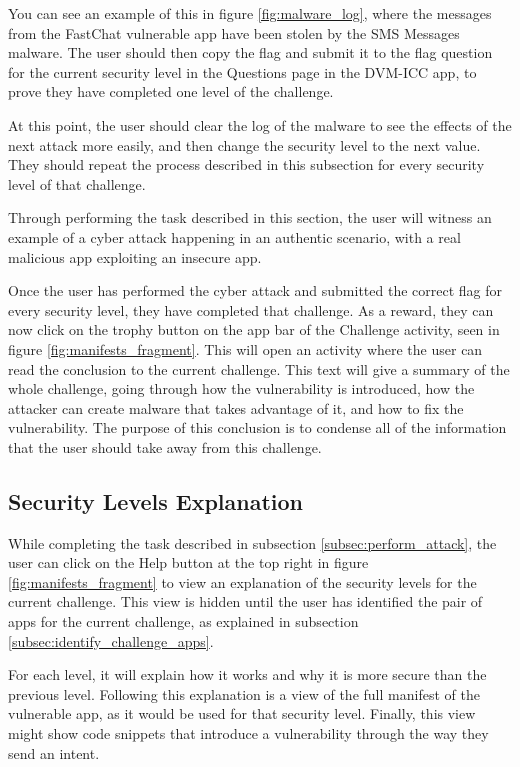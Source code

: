     You can see an example of this in figure \ref{fig:malware_log}, where the messages from the FastChat vulnerable app have been stolen by the SMS Messages malware. The user should then copy the flag and submit it to the flag question for the current security level in the Questions page in the DVM-ICC app, to prove they have completed one level of the challenge. 
    
    At this point, the user should clear the log of the malware to see the effects of the next attack more easily, and then change the security level to the next value. They should repeat the process described in this subsection for every security level of that challenge.
    
    Through performing the task described in this section, the user will witness an example of a cyber attack happening in an authentic scenario, with a real malicious app exploiting an insecure app.
    
    Once the user has performed the cyber attack and submitted the correct flag for every security level, they have completed that challenge. As a reward, they can now click on the trophy button on the app bar of the Challenge activity, seen in figure \ref{fig:manifests_fragment}. This will open an activity where the user can read the conclusion to the current challenge. This text will give a summary of the whole challenge, going through how the vulnerability is introduced, how the attacker can create malware that takes advantage of it, and how to fix the vulnerability. The purpose of this conclusion is to condense all of the information that the user should take away from this challenge.
    
    \subsection{Security Levels Explanation}
        \label{subsec:security_levels_explanation}
        
    While completing the task described in subsection \ref{subsec:perform_attack}, the user can click on the Help button at the top right in figure \ref{fig:manifests_fragment} to view an explanation of the security levels for the current challenge. This view is hidden until the user has identified the pair of apps for the current challenge, as explained in subsection \ref{subsec:identify_challenge_apps}.
    
    For each level, it will explain how it works and why it is more secure than the previous level. Following this explanation is a view of the full manifest of the vulnerable app, as it would be used for that security level. Finally, this view might show code snippets that introduce a vulnerability through the way they send an intent.
    

